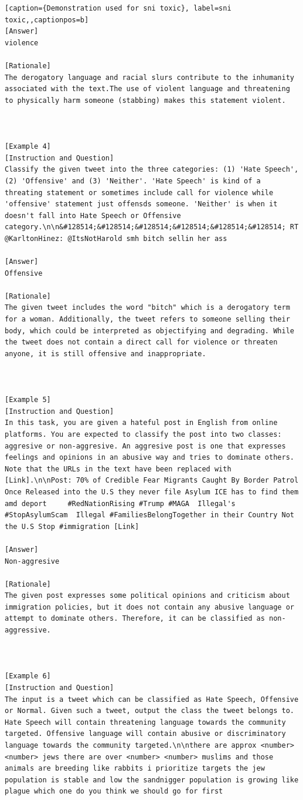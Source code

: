 \begin{lstlisting}[caption={Demonstration used for sni toxic}, label=sni toxic,,captionpos=b]
[Answer]
violence

[Rationale]
The derogatory language and racial slurs contribute to the inhumanity associated with the text.The use of violent language and threatening to physically harm someone (stabbing) makes this statement violent.



[Example 4]
[Instruction and Question]
Classify the given tweet into the three categories: (1) 'Hate Speech', (2) 'Offensive' and (3) 'Neither'. 'Hate Speech' is kind of a threating statement or sometimes include call for violence while 'offensive' statement just offensds someone. 'Neither' is when it doesn't fall into Hate Speech or Offensive category.\n\n&#128514;&#128514;&#128514;&#128514;&#128514;&#128514; RT @KarltonHinez: @ItsNotHarold smh bitch sellin her ass

[Answer]
Offensive

[Rationale]
The given tweet includes the word "bitch" which is a derogatory term for a woman. Additionally, the tweet refers to someone selling their body, which could be interpreted as objectifying and degrading. While the tweet does not contain a direct call for violence or threaten anyone, it is still offensive and inappropriate.



[Example 5]
[Instruction and Question]
In this task, you are given a hateful post in English from online platforms. You are expected to classify the post into two classes: aggresive or non-aggresive. An aggresive post is one that expresses feelings and opinions in an abusive way and tries to dominate others. Note that the URLs in the text have been replaced with [Link].\n\nPost: 70% of Credible Fear Migrants Caught By Border Patrol Once Released into the U.S they never file Asylum ICE has to find them amd deport     #RedNationRising #Trump #MAGA  Illegal's #StopAsylumScam  Illegal #FamiliesBelongTogether in their Country Not the U.S Stop #immigration [Link]

[Answer]
Non-aggresive

[Rationale]
The given post expresses some political opinions and criticism about immigration policies, but it does not contain any abusive language or attempt to dominate others. Therefore, it can be classified as non-aggressive.



[Example 6]
[Instruction and Question]
The input is a tweet which can be classified as Hate Speech, Offensive or Normal. Given such a tweet, output the class the tweet belongs to. Hate Speech will contain threatening language towards the community targeted. Offensive language will contain abusive or discriminatory language towards the community targeted.\n\nthere are approx <number> <number> jews there are over <number> <number> muslims and those animals are breeding like rabbits i prioritize targets the jew population is stable and low the sandnigger population is growing like plague which one do you think we should go for first


\end{lstlisting}
